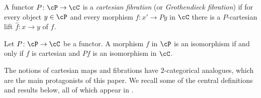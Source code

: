\documentclass[11pt, dvipsnames]{amsart}
\begin{document}
	\begin{defn}
		A functor $P\colon\cP \to \cC$ is a \emph{cartesian fibration} (or \emph{Grothendieck fibration}) if for every object $y \in \cP$ and every morphism $f\colon x' \to Py$ in $\cC$ there is a  $P$-cartesian lift $\widehat{f}\colon x \to y$ of $f$. 
	\end{defn}

    \begin{prop}\label{prop:cartesian_isomorphism_1cats}
		Let $P\colon\cP \to \cC$ be a functor. A morphism $f$ in $\cP$ is an isomorphism if and only if $f$ is cartesian and $Pf$ is an isomorphism in $\cC$.
	\end{prop}

    The notions of cartesian maps and fibrations have $2$-categorical analogues, which are the main protagonists of this paper. We recall some of the central definitions and results below, all of which appear in \cite{Buckley2014}.
\end{document}
